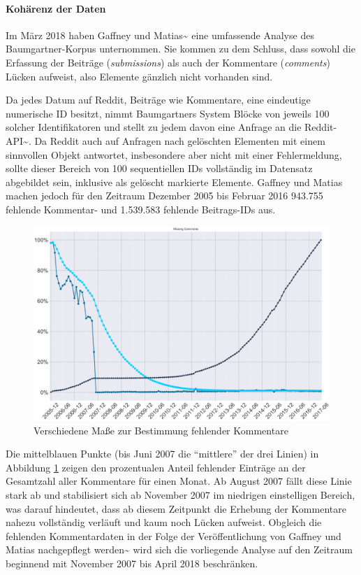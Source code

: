 \documentclass[11pt,a4paper,twoside]{article}
\let\oldparagraph\paragraph
\renewcommand{\paragraph}[1]{\oldparagraph{#1}\mbox{}}
\begin{document}
\hypertarget{coherence}{%
\paragraph{Kohärenz der Daten}\label{coherence}}

Im März 2018 haben Gaffney und
Matias\textasciitilde{}\autocite{Gaffney2018} eine umfassende Analyse
des Baumgartner-Korpus unternommen. Sie kommen zu dem Schluss, dass
sowohl die Erfassung der Beiträge (\emph{submissions}) als auch der
Kommentare (\emph{comments}) Lücken aufweist, also Elemente gänzlich
nicht vorhanden sind.

Da jedes Datum auf Reddit, Beiträge wie Kommentare, eine eindeutige
numerische ID besitzt, nimmt Baumgartners System Blöcke von jeweils 100
solcher Identifikatoren und stellt zu jedem davon eine Anfrage an die
Reddit-API\textasciitilde{}\autocite{Baumgartner2018a}. Da Reddit auch
auf Anfragen nach gelöschten Elementen mit einem sinnvollen Objekt
antwortet, insbesondere aber nicht mit einer Fehlermeldung, sollte
dieser Bereich von 100 sequentiellen IDs vollständig im Datensatz
abgebildet sein, inklusive als gelöscht markierte Elemente. Gaffney und
Matias machen jedoch für den Zeitraum Dezember 2005 bis Februar 2016
943.755 fehlende Kommentar- und 1.539.583 fehlende Beitrags-IDs aus.




\begin{figure}

{\centering \includegraphics[width=0.8\linewidth]{./images/gaffneymatias_fig4} 

}

\caption{Verschiedene Maße zur Bestimmung fehlender Kommentare
\autocite{Gaffney2018}}\label{fig:gf4}
\end{figure}

Die mittelblauen Punkte (bis Juni 2007 die \enquote{mittlere} der drei
Linien) in Abbildung \ref{fig:gf4} zeigen den prozentualen Anteil
fehlender Einträge an der Gesamtzahl aller Kommentare für einen Monat.
Ab August 2007 fällt diese Linie stark ab und stabilisiert sich ab
November 2007 im niedrigen einstelligen Bereich, was darauf hindeutet,
dass ab diesem Zeitpunkt die Erhebung der Kommentare nahezu vollständig
verläuft und kaum noch Lücken aufweist. Obgleich die fehlenden
Kommentardaten in der Folge der Veröffentlichung von Gaffney und Matias
nachgepflegt werden\textasciitilde{}\autocite{Baumgartner2018} wird sich
die vorliegende Analyse auf den Zeitraum beginnend mit November 2007 bis
April 2018 beschränken.
\end{document}
